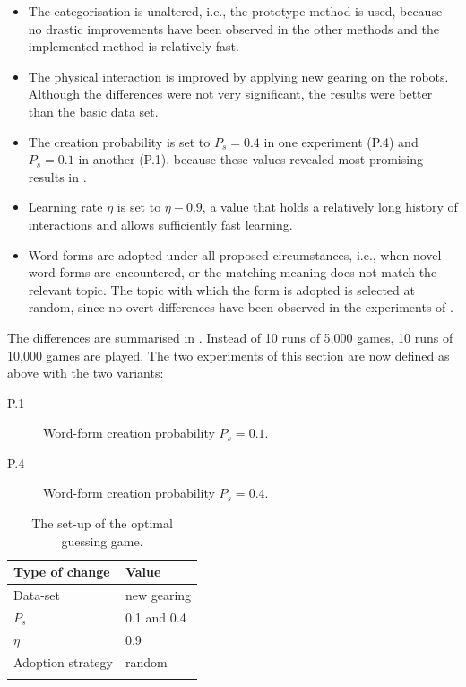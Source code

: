 \begin{itemize}
\item The categorisation is unaltered, i.e., the prototype method is used, because no drastic improvements have been observed in the other methods and the implemented method is relatively fast.

\item The physical interaction is improved by applying new gearing on the robots. Although the differences were not very significant, the results were better than the basic data set.

\item The creation probability is set to $P_s=0.4$ in one experiment (P.4) and $P_s=0.1$ in another (P.1), because these values revealed most promising results in .

\item Learning rate $\eta$ is set to $\eta-0.9$, a value that holds a relatively long history of interactions and allows sufficiently fast learning.

\item Word-forms are adopted under all proposed circumstances, i.e., when novel word-forms are encountered, or the matching meaning does not match the relevant topic. The topic with which the form is adopted is selected at random, since no overt differences have been observed in the experiments of .
\end{itemize}

The differences are summarised in . Instead of 10 runs of 5,000 games, 10 runs of 10,000 games are played. The two experiments of this section are now defined as above with the two variants:

\begin{description}
\item[P.1] Word-form creation probability $P_s=0.1$.
\item[P.4] Word-form creation probability $P_s=0.4$.
\end{description}

\begin{table}
	\centering
	\begin{tabular}{ll}
		\lsptoprule
		Type of change & Value\\\midrule
		Data-set & new gearing\\%
		$P_s$ & 0.1 and 0.4\\%
		$\eta$ & 0.9\\%
		Adoption strategy & random\\%
		\lspbottomrule
	\end{tabular}
	\caption{The set-up of the optimal guessing game.}
	\label{t:opt:gg1}
\end{table}

